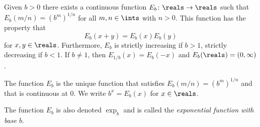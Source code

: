 \documentclass[article, a4paper, 11pt, oneside]{memoir}
\numberwithin{equation}{chapter}
\begin{document}
\begin{theorem}
    Given $b > 0$ there exists a continuous function $E_b \colon \reals \to \reals$ such that $E_b(m/n) = (b^m)^{1/n}$ for all $m,n \in \ints$ with $n > 0$. This function has the property that
    \begin{equation*}
        E_b(x+y) = E_b(x) E_b(y)
    \end{equation*}
    for $x,y \in \reals$. Furthermore, $E_b$ is strictly increasing if $b > 1$, strictly decreasing if $b < 1$. If $b \neq 1$, then $E_{1/b}(x) = E_b(-x)$ and $E_b(\reals) = (0,\infty)$.
    
    The function $E_b$ is the unique function that satisfies $E_b(m/n) = (b^m)^{1/n}$ and that is continuous at $0$. We write $b^x = E_b(x)$ for $x \in \reals$.
\end{theorem}
%
The function $E_b$ is also denoted $\exp_b$ and is called the \emph{exponential function with base $b$}.
\end{document}
